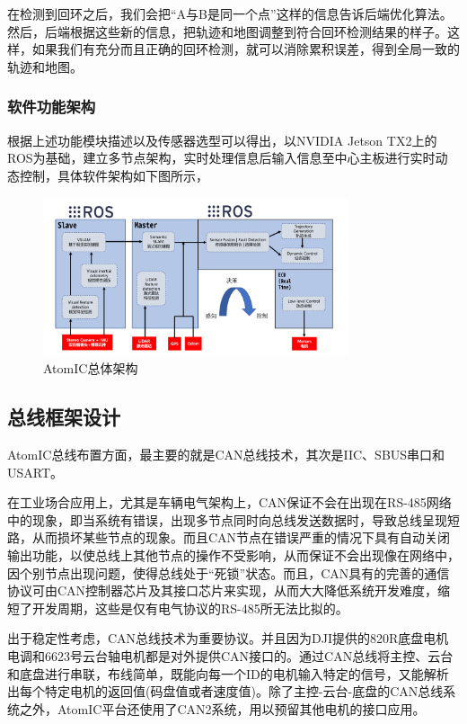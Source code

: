 在检测到回环之后，我们会把“A与B是同一个点”这样的信息告诉后端优化算法。然后，后端根据这些新的信息，把轨迹和地图调整到符合回环检测结果的样子。这样，如果我们有充分而且正确的回环检测，就可以消除累积误差，得到全局一致的轨迹和地图。

\subsubsection{软件功能架构}

根据上述功能模块描述以及传感器选型可以得出，以NVIDIA Jetson TX2上的ROS为基础，建立多节点架构，实时处理信息后输入信息至中心主板进行实时动态控制，具体软件架构如下图所示，

\begin{figure}[H]
	\centering
	\includegraphics[width = 0.8\textwidth]{fig/rjjg.png}
	\caption{AtomIC总体架构}
	\label{rjjg}
\end{figure}

\subsection{总线框架设计}

AtomIC总线布置方面，最主要的就是CAN总线技术，其次是IIC、SBUS串口和USART。

在工业场合应用上，尤其是车辆电气架构上，CAN保证不会在出现在RS-485网络中的现象，即当系统有错误，出现多节点同时向总线发送数据时，导致总线呈现短路，从而损坏某些节点的现象。而且CAN节点在错误严重的情况下具有自动关闭输出功能，以使总线上其他节点的操作不受影响，从而保证不会出现像在网络中，因个别节点出现问题，使得总线处于“死锁”状态。而且，CAN具有的完善的通信协议可由CAN控制器芯片及其接口芯片来实现，从而大大降低系统开发难度，缩短了开发周期，这些是仅有电气协议的RS-485所无法比拟的。

出于稳定性考虑，CAN总线技术为重要协议。并且因为DJI提供的820R底盘电机电调和6623号云台轴电机都是对外提供CAN接口的。通过CAN总线将主控、云台和底盘进行串联，布线简单，既能向每一个ID的电机输入特定的信号，又能解析出每个特定电机的返回值(码盘值或者速度值)。除了主控-云台-底盘的CAN总线系统之外，AtomIC平台还使用了CAN2系统，用以预留其他电机的接口应用。

